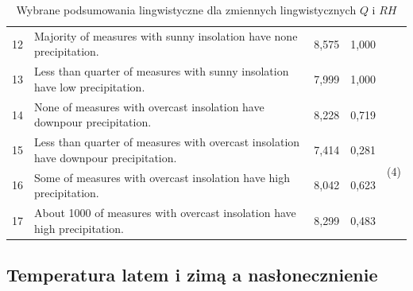 \documentclass{classrep}
\begin{document}
\begin{table}[H]
\begin{center}
\begin{tabularx}{\linewidth}{ |c|X|c|c|c| }
12	&	Majority of measures with sunny insolation have none precipitation.	&	8,575	&	1,000 & \multirow{6}{1em}{\newline\newline\newline\newline\newline(4)} \\
\cline{1-4}
13	&	Less than quarter of measures with sunny insolation have low precipitation.	&	7,999	&	1,000 & \\
\cline{1-4}
14	&	None of measures with overcast insolation have downpour precipitation.	&	8,228	&	0,719  & \\
\cline{1-4}
15	&	Less than quarter of measures with overcast insolation have downpour precipitation.	&	7,414	&	0,281  & \\
\cline{1-4}
16	&	Some of measures with overcast insolation have high precipitation.	&	8,042	&	0,623  & \\
\cline{1-4}
17	&	About 1000 of measures with overcast insolation have high precipitation.	&	8,299	&	0,483  & \\
\hline
\end{tabularx}
\caption{Wybrane podsumowania lingwistyczne dla zmiennych lingwistycznych $Q$ i $RH$}
\end{center}
\end{table}

\clearpage

\subsection{Temperatura latem i zimą a nasłonecznienie}
\end{document}
